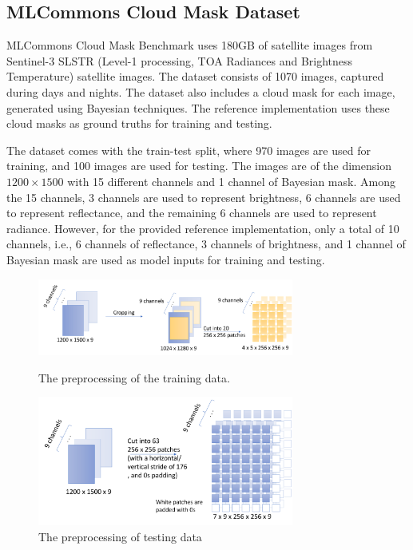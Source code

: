 \documentclass[sigplan,screen]{acmart}
\begin{document}
\subsection{MLCommons Cloud Mask Dataset}

MLCommons Cloud Mask Benchmark uses 180GB of satellite images from Sentinel-3 SLSTR (Level-1 processing, TOA Radiances and Brightness Temperature) satellite images. The dataset consists of 1070 images, captured during days and nights. The dataset also includes a cloud mask for each image, generated using Bayesian techniques. The reference implementation uses these cloud masks as ground truths for training and testing.

The dataset comes with the train-test split, where 970 images are used for training, and 100 images are used for testing. 
The images are of the dimension $1200 \times 1500$ with 15 different channels and 1 channel of Bayesian mask. Among the 15 channels, 3 channels are used to represent brightness, 6 channels are used to represent reflectance, and the remaining 6 channels are used to represent radiance. However, for the provided reference implementation, only a total of 10 channels, i.e., 6 channels of reflectance, 3 channels of brightness, and 1 channel of Bayesian mask are used as model inputs for training and testing. 

\begin{figure}[htb]

\centering\includegraphics[width=0.75\textwidth]{images/cloudmask-preprocessing-training-data-2.pdf}
\caption{The preprocessing of the training data.}
\label{fig:preprocessing-training}

\bigskip

\centering\includegraphics[width=0.75\textwidth]{images/cloudmask-preprocessing-testing-data-2.pdf}
\caption{The preprocessing of testing data}
\label{fig:preprocessing-testing}

\end{figure}
\end{document}
